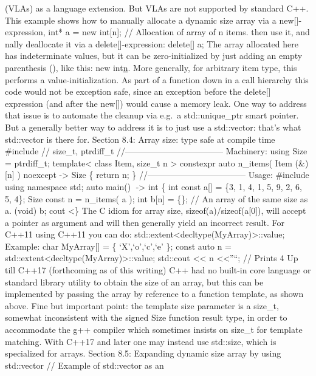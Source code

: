 (VLAs) as a language extension. But VLAs are not supported by standard
C++. This example shows how to manually allocate a dynamic size array
via a new{[}{]}-expression, int* a = new int{[}n{]}; // Allocation of
array of n items. then use it, and nally deallocate it via a
delete{[}{]}-expression: delete{[}{]} a; The array allocated here has
indeterminate values, but it can be zero-initialized by just adding an
empty parenthesis (), like this: new int\href{}{n}. More generally, for
arbitrary item type, this performs a value-initialization. As part of a
function down in a call hierarchy this code would not be exception safe,
since an exception before the delete{[}{]} expression (and after the
new{[}{]}) would cause a memory leak. One way to address that issue is
to automate the cleanup via e.g.~a std::unique\_ptr smart pointer. But a
generally better way to address it is to just use a std::vector: that's
what std::vector is there for. Section 8.4: Array size: type safe at
compile time \#include // size\_t, ptrdiff\_t
//----------------------------------- Machinery: using Size =
ptrdiff\_t; template\textless{} class Item, size\_t n \textgreater{}
constexpr auto n\_items( Item (\&){[}n{]} ) noexcept -\textgreater{}
Size \{ return n; \} //----------------------------------- Usage:
\#include using namespace std; auto main() -\textgreater{} int \{ int
const a{[}{]} = \{3, 1, 4, 1, 5, 9, 2, 6, 5, 4\}; Size const n =
n\_items( a ); int b{[}n{]} = \{\}; // An array of the same size as a.
(void) b; cout \textless\} The C idiom for array size,
sizeof(a)/sizeof(a{[}0{]}), will accept a pointer as argument and will
then generally yield an incorrect result. For C++11 using C++11 you can
do: std::extent\textless decltype(MyArray)\textgreater::value; Example:
char MyArray{[}{]} = \{ `X',`o',`c',`e' \}; const auto n =
std::extent\textless decltype(MyArray)\textgreater::value; std::cout
\textless\textless{} n \textless\textless{}''\n``; // Prints 4 Up till
C++17 (forthcoming as of this writing) C++ had no built-in core language
or standard library utility to obtain the size of an array, but this can
be implemented by passing the array by reference to a function template,
as shown above. Fine but important point: the template size parameter is
a size\_t, somewhat inconsistent with the signed Size function result
type, in order to accommodate the g++ compiler which sometimes insists
on size\_t for template matching. With C++17 and later one may instead
use std::size, which is specialized for arrays. Section 8.5: Expanding
dynamic size array by using std::vector // Example of std::vector as an

